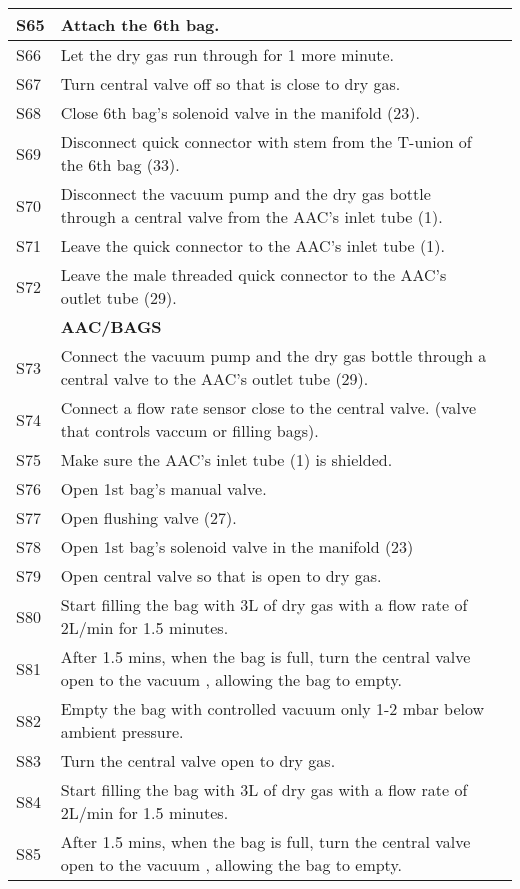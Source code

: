 \begin{longtable} {|m{}|m{}|m{}|}
S65 & Attach the 6th bag. & \\ \hline
S66 & Let the dry gas run through for 1 more minute. & \\ \hline
S67 & Turn central valve off so that is close to dry gas. & \\ \hline
S68 & Close 6th bag's solenoid valve in the manifold (23). & \\ \hline
S69 & Disconnect quick connector with stem from the T-union of the 6th bag (33). & \\ \hline
S70 & Disconnect the vacuum pump and the dry gas bottle through a central valve from the AAC's inlet tube (1). & \\ \hline
S71 & Leave the quick connector to the AAC's inlet tube (1). & \\ \hline
S72 & Leave the male threaded quick connector to the AAC's outlet tube (29). & \\ \hline
& \textbf{AAC/BAGS} & \\ \hline
S73 & Connect the vacuum pump and the dry gas bottle through a central valve to the AAC's outlet tube (29). & \\ \hline
S74 & Connect a flow rate sensor close to the central valve. (valve that controls vaccum or filling bags). & \\ \hline
S75 & Make sure the AAC's inlet tube (1) is shielded. & \\ \hline
S76 & Open 1st bag's manual valve. & \\ \hline
S77 & Open flushing valve (27). & \\ \hline
S78 & Open 1st bag's solenoid valve in the manifold (23) & \\ \hline
S79 & Open central valve so that is open to dry gas. & \\ \hline
S80 & Start filling the bag with 3L of dry gas with a flow rate of 2L/min for 1.5 minutes. & \\ \hline
S81 & After 1.5 mins, when the bag is full, turn the central valve open to the vacuum , allowing the bag to empty. & \\ \hline
S82 & Empty the bag with controlled vacuum only 1-2 mbar below ambient pressure. & \\ \hline
S83 & Turn the central valve open to dry gas. & \\ \hline
S84 & Start filling the bag with 3L of dry gas with a flow rate of 2L/min for 1.5 minutes. & \\ \hline
S85 & After 1.5 mins, when the bag is full, turn the central valve open to the vacuum , allowing the bag to empty. & \\ \hline

\end{longtable}
